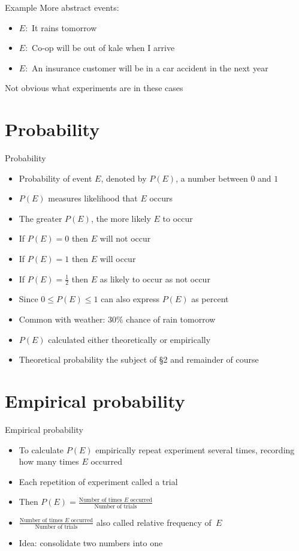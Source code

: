 \documentclass[handout]{beamer}
\theoremstyle{definition}
\begin{document}
\begin{frame}{Example}
More abstract events:
\begin{itemize}
\item $E:$ It rains tomorrow
\item $E:$ Co-op will be out of kale when I arrive
\item $E:$ An insurance customer will be in a car accident in the next year
\end{itemize}
Not obvious what experiments are in these cases
\end{frame}

\section{Probability}
\begin{frame}{Probability}
\begin{itemize}
\item \alert{Probability of event $E$}, denoted by $P\left(E\right)$,
a number between $0$ and $1$
\item $P\left(E\right)$ measures likelihood that $E$ occurs
\item The greater $P\left(E\right)$, the more likely $E$ to occur
\item If $P\left(E\right)=0$ then $E$ will not occur
\item If $P\left(E\right)=1$ then $E$ will occur
\item If $P\left(E\right)=\frac{1}{2}$ then $E$ 
as likely to occur as not occur
\item Since $0\le P\left(E\right)\le 1$ can also express
$P\left(E\right)$ as percent
\item Common with weather: \alert{$30\%$ chance of rain tomorrow}
\item $P\left(E\right)$ calculated either \alert{theoretically}
or \alert{empirically}
\item Theoretical probability the subject of \S2 and remainder of course
\end{itemize}
\end{frame}

\section{Empirical probability}
\begin{frame}{Empirical probability}
\begin{itemize}
\item To calculate $P\left(E\right)$ \alert{empirically}
repeat experiment several times, recording how
many times $E$ occurred
\item Each repetition of experiment called a \alert{trial}
\item Then $P\left(E\right)=
\frac{\text{Number of times $E$ occurred}}
{\text{Number of trials}}$
\item $\frac{\text{Number of times $E$ occurred}}
{\text{Number of trials}}$ also called
\alert{relative frequency of~$E$}
\item Idea: consolidate two numbers into one
\end{itemize}
\end{frame}
\end{document}
